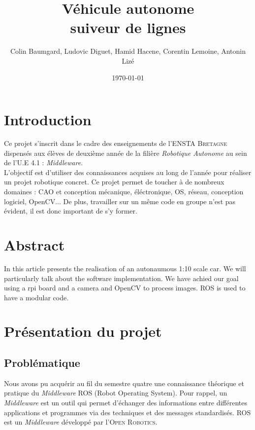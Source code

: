 \documentclass[12pt, openany]{report}
\title{Véhicule autonome \\ suiveur de lignes}
\author{Colin Baumgard, Ludovic Diguet, Hamid Hacene, Corentin Lemoine, Antonin Lizé}
\date{\today}
\begin{document}
\maketitle
\tableofcontents
\pagebreak

\section*{Introduction}
Ce projet s'inscrit dans le cadre des enseignements de l'\textsc{ENSTA Bretagne} dispensés aux élèves de deuxième année de la filière \textit{Robotique Autonome} au sein de l'U.E 4.1 : \textit{Middleware}.\\

L'objectif est d'utiliser des connaissances acquises au long de l'année pour réaliser un projet robotique concret. Ce projet permet de toucher à de nombreux domaines : CAO et conception mécanique, éléctronique, OS, réseau, conception logiciel, OpenCV... De plus, travailler sur un même code en groupe  n'est pas évident, il est donc important de s'y former.

\section*{Abstract}
In this article presents the realisation of an autonaumous 1:10 scale car. We will particularly talk about the software implementation. We have achied our goal using a rpi board and a camera and OpenCV to process images. ROS is used to have a modular code.

\pagebreak

\section{Présentation du projet}
\subsection{Problématique}
Nous avons pu acquérir au fil du semestre quatre une connaissance théorique et pratique du \textit{Middleware} \textsc{ROS} (Robot Operating System). Pour rappel, un \textit{Middleware} est un outil qui permet d'échanger des informations entre différentes applications et programmes via des techniques et des messages standardisés. \textsc{ROS} est un \textit{Middleware} développé par l'\textsc{Open Robotics}.\\
\end{document}
